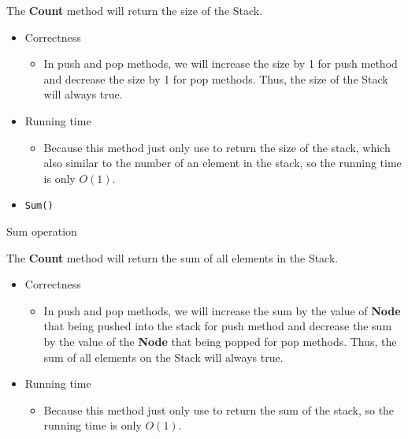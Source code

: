 \documentclass{article}
\begin{document}
	The \textbf{Count} method will return the size of the Stack.

	\newpage
	\begin{itemize}
		\item Correctness
		\begin{itemize}
			\item In push and pop methods, we will increase the size by 1 for push method and decrease the size by 1 for pop methods. Thus, the size of the Stack will always true. 
		\end{itemize}
		\item Running time
		\begin{itemize}
			\item Because this method just only use to return the size of the stack, which also similar to the number of an element in the stack, so the running time is only \(O(1)\).
		\end{itemize}
	\end{itemize}



	\begin{itemize}
		\item \verb|Sum()|
	\end{itemize}



	\begin{algorithm}[H]
		\caption{Sum operation}
		\label{Sum}
	\begin{algorithmic}[1]
		\State {}
		\EndFunction{}
	\end{algorithmic}		
	\end{algorithm}


	The \textbf{Count} method will return the sum of all elements in the Stack.

	\newpage
	\begin{itemize}
		\item Correctness
		\begin{itemize}
			\item In push and pop methods, we will increase the sum by the value of \textbf{Node} that being pushed into the stack for push method and decrease the sum by the value of the \textbf{Node} that being popped for pop methods. Thus, the sum of all elements on the Stack will always true. 
		\end{itemize}
		\item Running time
		\begin{itemize}
			\item Because this method just only use to return the sum of the stack, so the running time is only \(O(1)\).
		\end{itemize}
	\end{itemize}
\end{document}
